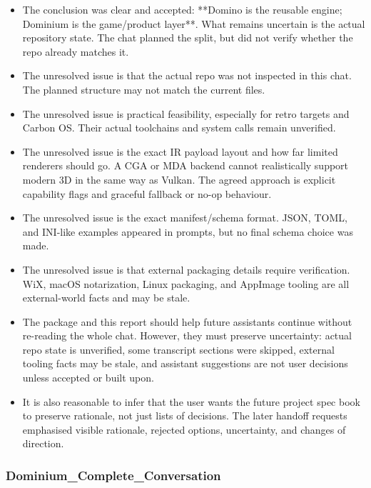 \documentclass[11pt,a4paper]{report}
\begin{document}
\begin{itemize}
\item The conclusion was clear and accepted: **Domino is the reusable engine; Dominium is the game/product layer**. What remains uncertain is the actual repository state. The chat planned the split, but did not verify whether the repo already matches it.
\item The unresolved issue is that the actual repo was not inspected in this chat. The planned structure may not match the current files.
\item The unresolved issue is practical feasibility, especially for retro targets and Carbon OS. Their actual toolchains and system calls remain unverified.
\item The unresolved issue is the exact IR payload layout and how far limited renderers should go. A CGA or MDA backend cannot realistically support modern 3D in the same way as Vulkan. The agreed approach is explicit capability flags and graceful fallback or no-op behaviour.
\item The unresolved issue is the exact manifest/schema format. JSON, TOML, and INI-like examples appeared in prompts, but no final schema choice was made.
\item The unresolved issue is that external packaging details require verification. WiX, macOS notarization, Linux packaging, and AppImage tooling are all external-world facts and may be stale.
\item The package and this report should help future assistants continue without re-reading the whole chat. However, they must preserve uncertainty: actual repo state is unverified, some transcript sections were skipped, external tooling facts may be stale, and assistant suggestions are not user decisions unless accepted or built upon.
\item It is also reasonable to infer that the user wants the future project spec book to preserve rationale, not just lists of decisions. The later handoff requests emphasised visible rationale, rejected options, uncertainty, and changes of direction.
\end{itemize}

\subsubsection{Dominium\_Complete\_Conversation}
\end{document}
